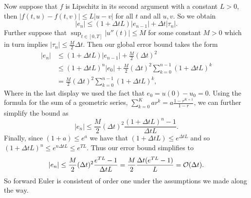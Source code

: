 Now suppose that $f$ is Lipschitz in its second argument with 
a constant $L > 0$, then $|f(t, u) - f(t, v)| \le L |u - v|$ for all $t$ and all $u, v$.
So we obtain 
\begin{equation*}
    |e_n| \le (1 + \Delta t L) |e_{n-1}| + \Delta t |\tau_n|.
\end{equation*}
Further suppose that $\sup_{t \in [0, T]} |u''(t)| \le M$ for 
some constant $M > 0$ which in turn implies $|\tau_n| 
\le \frac{M}{2} \Delta t.$ Then our global error bound 
takes the form 
\begin{equation*}
    \begin{aligned}
            |e_n| & \le (1 + \Delta t L) |e_{n-1}| + \frac{M}{2} (\Delta t)^2 \\
    & \le (1 + \Delta t L)^n |e_0| + 
    \frac{M}{2} (\Delta t)^2 \sum_{k=0}^{n-1} (1 + \Delta t L)^k \\ 
    & = \frac{M}{2} (\Delta t)^2 \sum_{k=0}^{n-1} (1 + \Delta t L)^k,
    \end{aligned}
\end{equation*}
Where in the last display we used the fact that $e_0 = u(0) - u_0 = 0$.
Using the formula for the sum of a geometric series, 
$\sum_{k=0}^K a r^k = a \frac{1 - r^{K+1}}{1 - r}$, 
we can further simplify the bound as
\begin{equation*}
    |e_n| \le \frac{M}{2} (\Delta t)^2 \frac{(1 + \Delta t L)^n - 1}{\Delta t L}.
\end{equation*}
Finally, since $(1 + a) \le e^a$ we have that 
$(1 + \Delta t L) \le e^{\Delta t L}$ and so 
$(1 + \Delta t L)^n \le e^{n \Delta t L} \le e^{T L}$. Thus 
our error bound simplifies to 
\begin{equation*}
    |e_n| \le \frac{M}{2} (\Delta t)^2 \frac{e^{T L} - 1}{\Delta t L} = \frac{M}{2} \frac{\Delta t (e^{T L} - 1)}{L} = \mathcal{O}(\Delta t).
\end{equation*}
So forward Euler is consistent of order one under the 
assumptions we made along the way. 